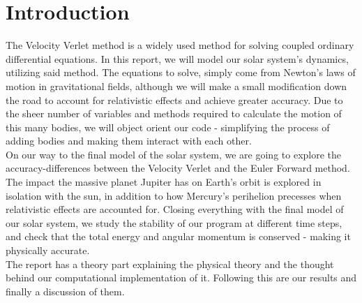 \documentclass[../main.tex]{subfiles}
\begin{document}
\section{Introduction}\label{introduction}
The Velocity Verlet method is a widely used method for solving coupled ordinary differential equations. In this report, we will model our solar system's dynamics, utilizing said method. The equations to solve, simply come from Newton's laws of motion in gravitational fields, although we will make a small modification down the road to account for relativistic effects and achieve greater accuracy. Due to the sheer number of variables and methods required to calculate the motion of this many bodies, we will object orient our code - simplifying the process of adding bodies and making them interact with each other. \\
On our way to the final model of the solar system, we are going to explore the accuracy-differences between the Velocity Verlet and the Euler Forward method. The impact the massive planet Jupiter has on Earth's orbit is explored in isolation with the sun, in addition to how Mercury's perihelion precesses when relativistic effects are accounted for. Closing everything with the final model of our solar system, we study the stability of our program at different time steps, and check that the total energy and angular momentum is conserved - making it physically accurate. \\
The report has a theory part explaining the physical theory and the thought behind our computational implementation of it. Following this are our results and finally a discussion of them. 
\end{document}
